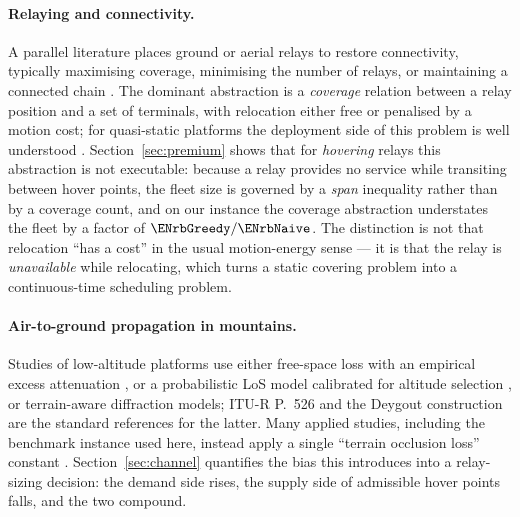 \documentclass[11pt]{article}
\theoremstyle{dshplain}
\theoremstyle{dshdefn}
\begin{document}
\paragraph{Relaying and connectivity.}
A parallel literature places ground or aerial relays to restore connectivity,
typically maximising coverage, minimising the number of relays, or maintaining a
connected chain \cite{zeng,mozaffari,zengtraj,zeng2016relay,relay5g,gomez2016}. The
dominant abstraction is a \emph{coverage} relation between a relay position and a
set of terminals, with relocation either free or penalised by a motion cost; for
quasi-static platforms the deployment side of this problem is well understood
\cite{alhourani2014,hourani2016}. Section~\ref{sec:premium} shows that for
\emph{hovering} relays this abstraction is not executable: because a relay
provides no service while transiting between hover points, the fleet size is
governed by a \emph{span} inequality rather than by a coverage count, and on our
instance the coverage abstraction understates the fleet by a factor of
$\ENrbGreedy/\ENrbNaive$. The distinction is not that relocation ``has a cost'' in
the usual motion-energy sense --- it is that the relay is \emph{unavailable} while
relocating, which turns a static covering problem into a continuous-time
scheduling problem.

\paragraph{Air-to-ground propagation in mountains.}
Studies of low-altitude platforms use either free-space loss with an empirical
excess attenuation \cite{matolak}, or a probabilistic LoS model calibrated for
altitude selection \cite{alhourani2014}, or terrain-aware diffraction models;
ITU-R P.~526 \cite{iturp526} and the Deygout construction \cite{deygout} are the
standard references for the latter. Many applied studies, including the
benchmark instance used here, instead apply a single ``terrain occlusion
loss'' constant \cite{matolak,alhourani2014}. Section~\ref{sec:channel}
quantifies the bias this introduces into a relay-sizing decision: the demand side
rises, the supply side of admissible hover points falls, and the two compound.
\end{document}
